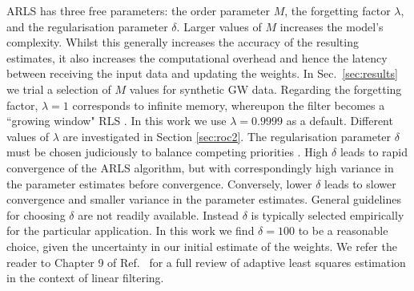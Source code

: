 \documentclass[pra,superscriptaddress,reprint,amsmath,amssymb,nofootinbib]{revtex4-2}
\begin{document}
ARLS has three free parameters: the order parameter $M$, the forgetting factor $\lambda$, and the regularisation parameter $\delta$. Larger values of $M$ increases the model's complexity. Whilst this generally increases the accuracy of the resulting estimates, it also increases the computational overhead and hence the latency between receiving the input data and updating the weights. In Sec.~\ref{sec:results} we trial a selection of $M$ values for synthetic GW data. Regarding the forgetting factor,  $\lambda=1$ corresponds to infinite memory, whereupon the filter becomes a ``growing window" RLS \citep{10.5555/547203,10.5555/560138}. In this work we use $\lambda=0.9999$ as a default. Different values of $\lambda$ are investigated in Section \ref{sec:roc2}. The regularisation parameter $\delta$ must be chosen judiciously to balance competing priorities  \citep{ljung1999system,1989system}. High $\delta$ leads to rapid convergence of the ARLS algorithm, but with correspondingly high variance in the parameter estimates before convergence. Conversely, lower $\delta$ leads to slower convergence and smaller variance in the parameter estimates. General guidelines for choosing $\delta$ are not readily available. Instead $\delta$ is typically selected empirically for the particular application. In this work we find $\delta = 100$ to be a reasonable choice, given the uncertainty in our initial estimate of the weights. We refer the reader to Chapter 9 of Ref.~\cite{HaykinAdaptiveFT:2002} for a full review of adaptive least squares estimation in the context of linear filtering. 
\end{document}
